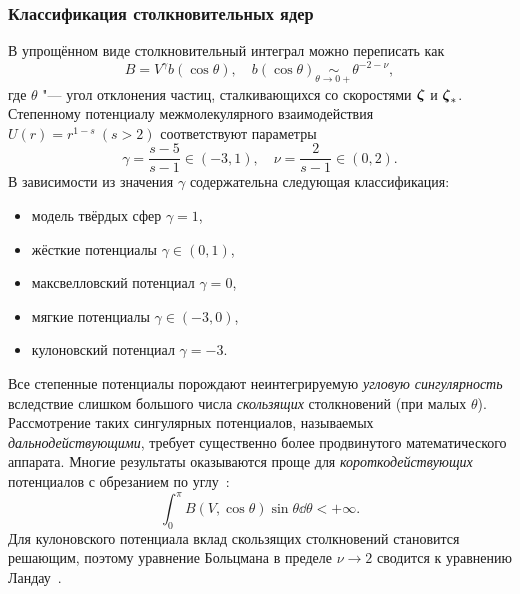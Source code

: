 \subsubsection{Классификация столкновительных ядер}

В упрощённом виде столкновительный интеграл можно переписать как
\begin{equation*}
    B = V^\gamma b(\cos\theta), \quad b(\cos\theta) \underset{\theta\to0+}{\sim} \theta^{-2-\nu},
\end{equation*}
где \(\theta\) "--- угол отклонения частиц, сталкивающихся со скоростями \({\boldsymbol{\zeta}}\) и \({\boldsymbol{\zeta}}_*\).
Степенному потенциалу межмолекулярного взаимодействия \( U(r)=r^{1-s}\:(s>2) \) соответствуют параметры
\begin{equation*}
    \gamma = \frac{s-5}{s-1}\in(-3,1), \quad \nu = \frac{2}{s-1}\in(0,2).
\end{equation*}
В зависимости из значения \(\gamma\) содержательна следующая классификация:
\begin{itemize}\label{eq:power_classification}
    \item модель твёрдых сфер \(\gamma=1\),
    \item жёсткие потенциалы \(\gamma\in(0,1)\),
    \item максвелловский потенциал \(\gamma=0\),
    \item мягкие потенциалы \(\gamma\in(-3,0)\),
    \item кулоновский потенциал \(\gamma=-3\).
\end{itemize}
Все степенные потенциалы порождают неинтегрируемую \emph{угловую сингулярность}
вследствие слишком большого числа \emph{скользящих} столкновений (при малых \(\theta\)).
Рассмотрение таких сингулярных потенциалов, называемых \emph{дальнодействующими},
требует существенно более продвинутого математического аппарата.
Многие результаты оказываются проще для \emph{короткодействующих} потенциалов с обрезанием по углу~\cite{Grad1970}:
\begin{equation*}\label{eq:angular_cutoff}
    \int_0^\pi B(V, \cos\theta)\sin\theta\dd\theta < +\infty.
\end{equation*}
Для кулоновского потенциала вклад скользящих столкновений становится решающим,
поэтому уравнение Больцмана в пределе \(\nu\to2\) сводится к уравнению Ландау~\cite{Arseniev1990}.

